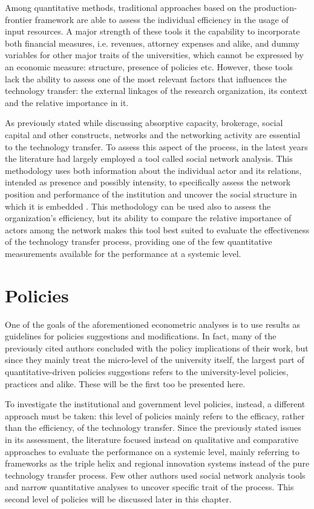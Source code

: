 Among quantitative methods, traditional approaches based on the production-frontier framework are able to assess the individual efficiency in the usage of input resources. A major strength of these tools it the capability to incorporate both financial measures, i.e. revenues, attorney expenses and alike, and dummy variables for other major traits of the universities, which cannot be expressed by an economic measure: structure, presence of policies etc. However, these tools lack the ability to assess one of the most relevant factors that influences the technology transfer: the external linkages of the research organization, its context and the relative importance in it. 

As previously stated while discussing absorptive capacity, brokerage, social capital and other constructs, networks and the networking activity are essential to the technology transfer. To assess this aspect of the process, in the latest years the literature had largely employed a tool called social network analysis. This methodology uses both information about the individual actor and its relations, intended as presence and possibly intensity, to specifically assess the network position and performance of the institution and uncover the social structure in which it is embedded \citep{Pinheiro2015}. This methodology can be used also to assess the organization's efficiency, but its ability to compare the relative importance of actors among the network makes this tool best suited to evaluate the effectiveness of the technology transfer process, providing one of the few quantitative measurements available for the performance at a systemic level.

\section{Policies}

One of the goals of the aforementioned econometric analyses is to use results as guidelines for policies suggestions and modifications. In fact, many of the previously cited authors concluded with the policy implications of their work, but since they mainly treat the micro-level of the university itself, the largest part of quantitative-driven policies suggestions refers to the university-level policies, practices and alike. These will be the first too be presented here.

To investigate the institutional and government level policies, instead, a different approach must be taken: this level of policies mainly refers to the efficacy, rather than the efficiency, of the technology transfer. Since the previously stated issues in its assessment, the literature focused instead on qualitative and comparative approaches to evaluate the performance on a systemic level, mainly referring to frameworks as the triple helix and regional innovation systems instead of the pure technology transfer process. Few other authors used social network analysis tools and narrow quantitative analyses to uncover specific trait of the process. This second level of policies will be discussed later in this chapter.

